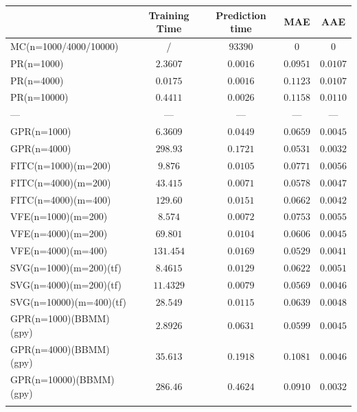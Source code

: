 \documentclass[12pt,a4paper,oneside]{book}
\begin{document}
\begin{table}\centering 
\begin{tabular}[t]{lcccc}\toprule
            &   Training Time  &  Prediction time &  MAE & AAE   \\ \midrule
MC(n=1000/4000/10000)    &/ & $93 390$ &  $0$  &  $0$     \\\addlinespace
PR(n=1000) & $2.3607$  & $0.0016$  & $0.0951$  & $0.0107$        \\\addlinespace
PR(n=4000)    & $0.0175$  & $0.0016$  & $0.1123$  & $0.0107$      \\\addlinespace
PR(n=10000)	   & $0.4411$  & $0.0026$   & $0.1158$ & $0.0110$     \\\addlinespace
\qquad \qquad \qquad \qquad \qquad ---	  &   --- & --- & --- & ---     \\\addlinespace
GPR(n=1000) & $6.3609$  & $0.0449$  & $0.0659$  &  $0.0045$        \\\addlinespace
GPR(n=4000)   & $298.93$   & $0.1721$  & $0.0531$  &  $0.0032$       \\\addlinespace
FITC(n=1000)(m=200)   & $9.876$  & $0.0105$  & $0.0771$  & $0.0056$     \\\addlinespace
FITC(n=4000)(m=200)    & $43.415$   & $0.0071$  & $0.0578$  &  $0.0047$      \\\addlinespace
FITC(n=4000)(m=400)	  & $129.60$  & $0.0151$   & $0.0662$  &  $0.0042$      \\\addlinespace
VFE(n=1000)(m=200)   & $8.574$   & $0.0072$  & $0.0753$  &  $0.0055$    \\\addlinespace
VFE(n=4000)(m=200)   & $69.801$  & $0.0104$  & $0.0606$  & $0.0045$   \\\addlinespace
VFE(n=4000)(m=400)	  & $131.454$   & $0.0169$  & $0.0529$   & $0.0041$   \\\addlinespace
SVG(n=1000)(m=200)(tf)   & $8.4615$  & $0.0129$  & $0.0622$  & $0.0051$    \\\addlinespace
SVG(n=4000)(m=200)(tf)   & $11.4329$  & $0.0079$  & $0.0569$  & $0.0046$    \\\addlinespace
SVG(n=10000)(m=400)(tf)	  & $28.549$  & $0.0115$  & $0.0639$   & $0.0048$    \\\addlinespace
GPR(n=1000)(BBMM)(gpy)   & $2.8926$  & $0.0631$  & $0.0599$  & $0.0045$    \\\addlinespace
GPR(n=4000)(BBMM)(gpy)   & $35.613$  & $0.1918$  & $0.1081$  & $0.0046$    \\\addlinespace
GPR(n=10000)(BBMM)(gpy)   & $286.46$  & $0.4624$  & $0.0910$  & $0.0032$    \\\addlinespace

\end{tabular}
\end{table}
\end{document}
